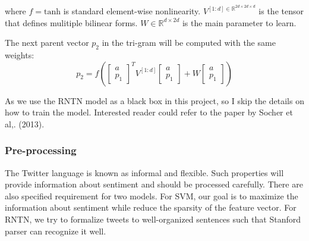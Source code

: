 where $f = \textrm{tanh}$ is standard element-wise nonlinearity. $V^{[1:d] \in \mathbb{R}^{2d \times 2d \times d}}$ is the tensor that defines mulitiple bilinear forms. $W \in \mathbb{R}^{d \times 2d}$ is the main parameter to learn. 

The next parent vector $p_2$ in the tri-gram will be computed with the same weights:
\begin{equation*}
p_2 = f \left(  
\begin{bmatrix}
a \\ p_1
\end{bmatrix}^T
V^{[1:d]} 
\begin{bmatrix}
a \\ p_1
\end{bmatrix}
+ W
\begin{bmatrix}
a \\ p_1
\end{bmatrix}
 \right)
\end{equation*}

As we use the RNTN model as a black box in this project, so I skip the details on how to train the model. Interested reader could refer to the paper by Socher et al,. (2013). 


\subsubsection{Pre-processing}
The Twitter language is known as informal and flexible. Such properties will provide information about sentiment and should be processed carefully. There are also specified requirement for two models. For SVM, our goal is to maximize the information about sentiment while reduce the sparsity of the feature vector. For RNTN, we try to formalize tweets to well-organized sentences such that Stanford parser can recognize it well.

